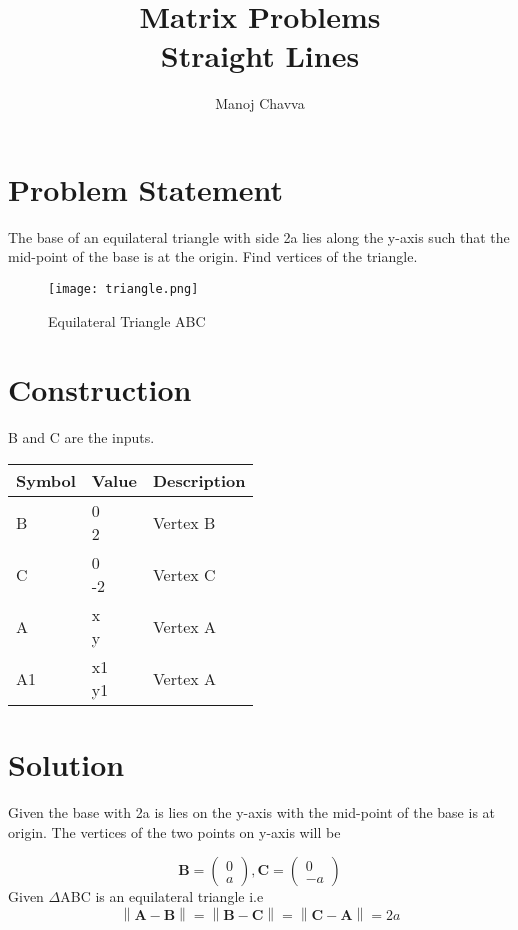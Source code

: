 \documentclass[journal,12pt,twocolumn]{IEEEtran}
\title{Matrix Problems \textbf{\\Straight Lines }}
\author{Manoj Chavva}
\providecommand{\norm}[1]{\left\lVert#1\right\rVert}
\let\vec\mathbf
\newcommand{\myvec}[1]{\ensuremath{\begin{pmatrix}#1\end{pmatrix}}}
\begin{document}
\maketitle



\section{Problem Statement}

\noindent The base of an equilateral triangle with side 2a lies along the y-axis such that the mid-point of the base is at the origin. Find vertices of the triangle.


\begin{figure}[h]
\texttt{[image: triangle.png]}
\caption{Equilateral Triangle ABC}
\label{fig:triangle}
\end{figure}

\section{Construction}
B and C are the inputs.
\begin{table}[h]
\centering
\large
\begin{tabular}{|l|l|l|}
\hline
\textbf{Symbol} & \textbf{Value} & \textbf{Description} \\ \hline
B               & \myvec{0 \\ 2}         & Vertex B             \\ \hline
C               & \myvec{0 \\ -2}        & Vertex C             \\ \hline
A               & \myvec{x \\ y}          & Vertex A             \\ \hline
A1              & \myvec{x1 \\ y1}       & Vertex A             \\ \hline
\end{tabular}
\end{table}

\section{Solution}
\noindent Given the base with 2a is lies on the y-axis with the mid-point of the base is at origin. The vertices of the two points on y-axis will be

\begin{equation}
\vec{B}=\begin{pmatrix} 
0\\
a
\end{pmatrix}, {
\vec{C}=\begin{pmatrix} 
0\\
-a
\end{pmatrix} }
\end{equation}
\noindent Given $\Delta$ABC is an equilateral triangle i.e 
\begin{equation}
 \norm{\vec{A}-\vec{B}}= \norm{\vec{B}-\vec{C}}= \norm{\vec{C}-\vec{A}} =2a
\end{equation}
\end{document}
